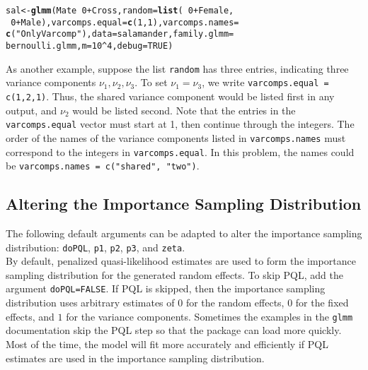 \documentclass[11pt]{article}\usepackage[]{graphicx}\usepackage[]{color}
\makeatletter
\newcommand{\hlnum}[1]{\textcolor[rgb]{0.686,0.059,0.569}{#1}}%
\newcommand{\hlstr}[1]{\textcolor[rgb]{0.192,0.494,0.8}{#1}}%
\newcommand{\hlopt}[1]{\textcolor[rgb]{0,0,0}{#1}}%
\newcommand{\hlstd}[1]{\textcolor[rgb]{0.345,0.345,0.345}{#1}}%
\newcommand{\hlkwb}[1]{\textcolor[rgb]{0.69,0.353,0.396}{#1}}%
\newcommand{\hlkwc}[1]{\textcolor[rgb]{0.333,0.667,0.333}{#1}}%
\newcommand{\hlkwd}[1]{\textcolor[rgb]{0.737,0.353,0.396}{\textbf{#1}}}%
\newenvironment{kframe}{%
 \def\at@end@of@kframe{}%
 \ifinner\ifhmode%
  \def\at@end@of@kframe{\end{minipage}}%
  \begin{minipage}{\columnwidth}%
 \fi\fi%
 \def\FrameCommand##1{\hskip\@totalleftmargin \hskip-\fboxsep
 \colorbox{shadecolor}{##1}\hskip-\fboxsep
     \hskip-\linewidth \hskip-\@totalleftmargin \hskip\columnwidth}%
 \MakeFramed {\advance\hsize-\width
   \@totalleftmargin\z@ \linewidth\hsize
   \@setminipage}}%
 {\par\unskip\endMakeFramed%
 \at@end@of@kframe}
\newenvironment{knitrout}{}{} %
\makeatother
\begin{document}
\begin{knitrout}
\color{fgcolor}\begin{kframe}
\begin{alltt}
\hlstd{sal} \hlkwb{<-} \hlkwd{glmm}\hlstd{(Mate} \hlopt{~} \hlnum{0} \hlopt{+} \hlstd{Cross,} \hlkwc{random} \hlstd{=} \hlkwd{list}\hlstd{(}\hlopt{~} \hlnum{0} \hlopt{+} \hlstd{Female,}
\hlopt{~} \hlnum{0} \hlopt{+} \hlstd{Male),} \hlkwc{varcomps.equal} \hlstd{=} \hlkwd{c}\hlstd{(} \hlnum{1}\hlstd{,} \hlnum{1}\hlstd{),} \hlkwc{varcomps.names} \hlstd{=}
\hlkwd{c}\hlstd{(}\hlstr{"Only Varcomp"}\hlstd{),} \hlkwc{data} \hlstd{= salamander,} \hlkwc{family.glmm} \hlstd{=}
\hlstd{bernoulli.glmm,} \hlkwc{m} \hlstd{=} \hlnum{10}\hlopt{^}\hlnum{4}\hlstd{,} \hlkwc{debug} \hlstd{=} \hlnum{TRUE}\hlstd{)}
\end{alltt}
\end{kframe}
\end{knitrout}
As another example, suppose the list \texttt{random} has three entries, indicating three variance components $\nu_1, \nu_2, \nu_3$. To set $\nu_1= \nu_3$, we write \texttt{varcomps.equal = c(1,2,1)}. Thus, the shared variance component would be listed first in any output, and $\nu_2$ would be listed second. Note that the entries in the \texttt{varcomps.equal} vector must start at 1, then continue through the integers. The order of the names of the variance components listed in \texttt{varcomps.names} must correspond to the integers in \texttt{varcomps.equal}. In this problem, the names could be \texttt{varcomps.names = c("shared", "two")}.  \\




\subsection{Altering the Importance Sampling Distribution}
The following default arguments can be adapted to alter the importance sampling distribution: \texttt{doPQL}, \texttt{p1}, \texttt{p2}, \texttt{p3}, and \texttt{zeta}.\\

By default, penalized quasi-likelihood estimates are used to form the importance sampling distribution for the generated random effects.  To skip PQL, add the argument \texttt{doPQL=FALSE}. If PQL is skipped, then the importance sampling distribution uses arbitrary estimates of $0$ for the random effects, $0$ for the fixed effects, and $1$ for the variance components. Sometimes the examples in the \texttt{glmm} documentation  skip the PQL step so that the package can load more quickly. Most of the time, the model will fit more accurately and efficiently if PQL estimates are used in the importance sampling distribution.\\
\end{document}
